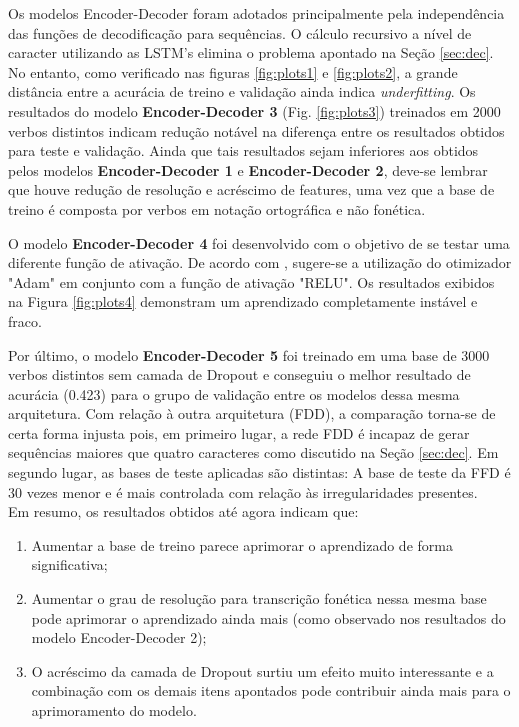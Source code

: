 Os modelos Encoder-Decoder foram adotados principalmente pela independência das funções de decodificação para sequências. O cálculo recursivo a nível de caracter utilizando as LSTM's elimina o problema apontado na Seção \ref{sec:dec}. No entanto, como verificado nas figuras \ref{fig:plots1} e \ref{fig:plots2}, a grande distância entre a acurácia de treino e validação ainda indica \textit{underfitting}. Os resultados do modelo \textbf{Encoder-Decoder 3} (Fig. \ref{fig:plots3}) treinados em 2000 verbos distintos indicam redução notável na diferença entre os resultados obtidos para teste e validação. Ainda que tais resultados sejam inferiores aos obtidos pelos modelos \textbf{Encoder-Decoder 1} e \textbf{Encoder-Decoder 2}, deve-se lembrar que houve redução de resolução e acréscimo de features, uma vez que a base de treino é composta por verbos em notação ortográfica e não fonética. 

O modelo \textbf{Encoder-Decoder 4} foi desenvolvido com o objetivo de se testar uma diferente função de ativação. De acordo com \cite{Goodfellow-et-al-2016}
, sugere-se a utilização do otimizador "Adam" em conjunto com a função de ativação "RELU". Os resultados exibidos na Figura \ref{fig:plots4} demonstram um aprendizado completamente instável e fraco. 

Por último, o modelo \textbf{Encoder-Decoder 5} foi treinado em uma base de 3000 verbos distintos sem camada de Dropout e conseguiu o melhor resultado de acurácia (0.423) para o grupo de validação entre os modelos dessa mesma arquitetura. Com relação à outra arquitetura (FDD), a comparação torna-se de certa forma injusta pois, em primeiro lugar, a rede FDD é incapaz de gerar sequências maiores que quatro caracteres como discutido na Seção \ref{sec:dec}. Em segundo lugar, as bases de teste aplicadas são distintas: A base de teste da FFD é 30 vezes menor e é mais controlada com relação às irregularidades presentes.\\

Em resumo, os resultados obtidos até agora indicam que: 

\begin{enumerate}
\item Aumentar a base de treino parece aprimorar o aprendizado de forma significativa;
\item Aumentar o grau de resolução para transcrição fonética nessa mesma base pode aprimorar o aprendizado ainda mais (como observado nos resultados do modelo Encoder-Decoder 2);
\item O acréscimo da camada de Dropout surtiu um efeito muito interessante e a combinação com os demais itens apontados pode contribuir ainda mais para o aprimoramento do modelo.
\end{enumerate}

